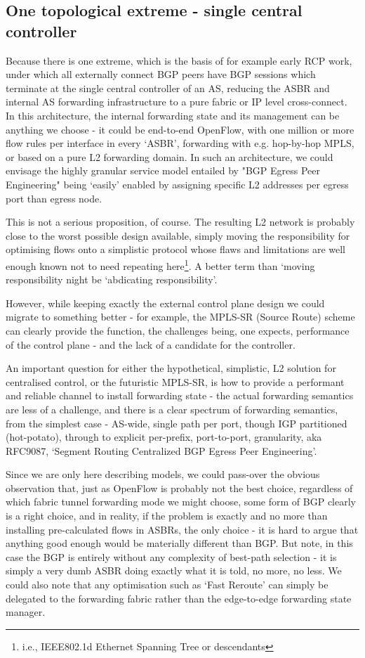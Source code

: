 \subsection{One topological extreme - single central controller}
Because there is one extreme, which is the basis of for example early RCP work, under which all externally connect BGP peers have BGP sessions which terminate at the single central controller of an AS, reducing the ASBR and internal AS forwarding infrastructure to a pure fabric or IP level cross-connect.  In this architecture, the internal forwarding state and its management can be anything we choose - it could be end-to-end OpenFlow, with one million or more flow rules per interface in every `ASBR', forwarding with e.g. hop-by-hop MPLS, or based on a pure L2 forwarding domain.  In such an architecture, we could envisage the highly granular service model entailed by "BGP Egress Peer Engineering" being `easily' enabled by assigning specific L2 addresses per egress port than egress node.

This is not a serious proposition, of course.  The resulting L2 network is probably close to the worst possible design available, simply moving the responsibility for optimising flows onto a simplistic protocol whose flaws and limitations are well enough known not to need repeating here\footnote{i.e., IEEE802.1d Ethernet Spanning Tree or descendants}.  A better term than `moving responsibility night be `abdicating responsibility'.

However, while keeping exactly the external control plane design we could migrate to something better - for example, the MPLS-SR (Source Route) scheme can clearly provide the function, the challenges being, one expects, performance of the control plane - and the lack of a candidate for the controller.

An important question for either the hypothetical, simplistic, L2 solution for centralised control, or the futuristic MPLS-SR, is how to provide a performant and reliable channel to install forwarding state - the actual forwarding semantics are less of a challenge, and there is a clear spectrum of forwarding semantics, from the simplest case - AS-wide, single path per port, though IGP partitioned (hot-potato), through to explicit per-prefix, port-to-port, granularity, aka RFC9087, `Segment Routing Centralized BGP Egress Peer Engineering'\cite{rfc9087}.

Since we are only here describing models, we could pass-over the obvious observation that, just as OpenFlow is probably not the best choice, regardless of which fabric tunnel forwarding mode we might choose, some form of BGP clearly is a right choice, and in reality, if the problem is exactly and no more than installing pre-calculated flows in ASBRs, the only choice - it is hard to argue that anything good enough would be materially different than BGP.  But note, in this case the BGP is entirely without any complexity of best-path selection - it is simply a very dumb ASBR doing exactly what it is told, no more, no less.   We could also note that any optimisation such as `Fast Reroute' can simply be delegated to the forwarding fabric rather than the edge-to-edge forwarding state manager.

